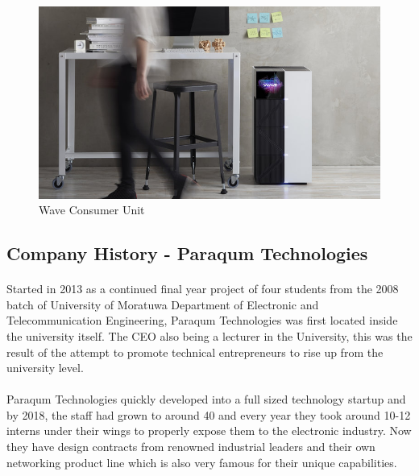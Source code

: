 \begin{figure}[h]
    \centering
    \includegraphics[trim=0cm 0cm 0cm 0cm, clip=true,scale=1]{figures/wave_lab.jpg}
    \caption{Wave Consumer Unit\label{Fig:wavelab}}\vspace{-4mm}
    \end{figure}


\subsection{Company History - Paraqum Technologies}
\paragraph{}
Started in 2013 as a continued final year project of four students from the 2008 batch of University of Moratuwa Department of Electronic and Telecommunication Engineering, Paraqum Technologies was first located inside the university itself. The CEO also being a lecturer in the University, this was the result of the attempt to promote technical entrepreneurs to rise up from the university level.

\paragraph{}
Paraqum Technologies quickly developed into a full sized technology startup and by 2018, the staff had grown to around 40 and every year they took around 10-12 interns under their wings to properly expose them to the electronic industry. Now they have design contracts from renowned industrial leaders and their own networking product line which is also very famous for their unique capabilities.

